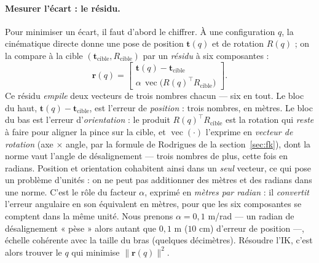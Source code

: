 \paragraph{Mesurer l'écart : le résidu.} Pour minimiser un écart, il faut d'abord le chiffrer. À une configuration $q$, la cinématique directe donne une pose de position $\mathbf{t}(q)$ et de rotation $R(q)$ ; on la compare à la cible $(\mathbf{t}_{\text{cible}}, R_{\text{cible}})$ par un \emph{résidu} à six composantes :
\[
  \mathbf{r}(q) =
  \begin{bmatrix} \mathbf{t}(q) - \mathbf{t}_{\text{cible}} \\[3pt]
  \alpha\,\operatorname{vec}\!\big(R(q)^{\top} R_{\text{cible}}\big) \end{bmatrix} .
\]
Ce résidu \emph{empile} deux vecteurs de trois nombres chacun --- six en tout. Le bloc du haut, $\mathbf{t}(q) - \mathbf{t}_{\text{cible}}$, est l'erreur de \emph{position} : trois nombres, en mètres. Le bloc du bas est l'erreur d'\emph{orientation} : le produit $R(q)^{\top} R_{\text{cible}}$ est la rotation qui \emph{reste} à faire pour aligner la pince sur la cible, et $\operatorname{vec}(\cdot)$ l'exprime en \emph{vecteur de rotation} (axe $\times$ angle, par la formule de Rodrigues de la section~\ref{sec:fk}), dont la norme vaut l'angle de désalignement --- trois nombres de plus, cette fois en radians. Position et orientation cohabitent ainsi dans un \emph{seul} vecteur, ce qui pose un problème d'unités : on ne peut pas additionner des mètres et des radians dans une norme. C'est le rôle du facteur $\alpha$, exprimé en \emph{mètres par radian} : il \emph{convertit} l'erreur angulaire en son équivalent en mètres, pour que les six composantes se comptent dans la même unité. Nous prenons $\alpha = 0{,}1$ m/rad --- un radian de désalignement « pèse » alors autant que $0{,}1$ m ($10$ cm) d'erreur de position ---, échelle cohérente avec la taille du bras (quelques décimètres). Résoudre l'IK, c'est alors trouver le $q$ qui minimise $\lVert \mathbf{r}(q) \rVert^2$.

